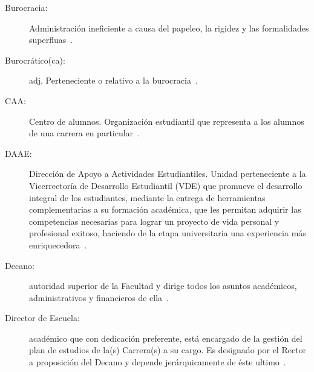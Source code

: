 \begin{glosario}
	\item 	\begin{description}
		\item[Burocracia:] Administración ineficiente a causa del papeleo, la rigidez y las 
		formalidades superfluas~\cite{16}.
	\end{description}

	\item 	\begin{description}
		\item[Burocrático(ca):] adj. Perteneciente o relativo a la burocracia~\cite{15}.
	\end{description}

	\item 	\begin{description}
		\item[CAA:] Centro de alumnos. Organización estudiantil que representa a los alumnos de una carrera en particular~\cite{3}.
	\end{description}

	\item 	\begin{description}
		\item[DAAE:] Dirección de Apoyo a Actividades Estudiantiles. Unidad perteneciente a la Vicerrectoría de Desarrollo Estudiantil (VDE) que promueve el desarrollo integral de los estudiantes, mediante la entrega de herramientas complementarias a su formación académica, que les permitan adquirir las competencias necesarias para lograr un proyecto de vida personal y profesional exitoso, haciendo de la etapa universitaria una experiencia más enriquecedora~\cite{1}.
	\end{description}

	\item 	\begin{description}
		\item[Decano:] autoridad superior de la Facultad y dirige todos los asuntos académicos, administrativos y financieros de ella~\cite{1}.
	\end{description}

	\item 	\begin{description}
		\item[Director de Escuela:] académico que con dedicación preferente, está encargado de la gestión del plan de estudios de la(s) Carrera(s) a su cargo. Es designado por el Rector a proposición del Decano y depende jerárquicamente de éste ultimo~\cite{1}.	
	\end{description}


\end{glosario}
